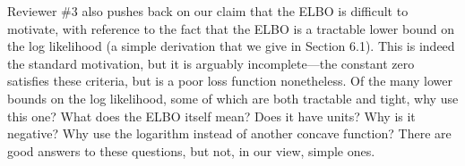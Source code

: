 \documentclass{article}
\theoremstyle{plain}
\theoremstyle{definition}
\begin{document}
Reviewer \#3 also pushes back on our claim that the ELBO is difficult to motivate, with reference to the fact that the ELBO is a tractable lower bound on the log likelihood (a simple derivation that we give in Section 6.1).   This is indeed the standard motivation, but it is arguably incomplete---the constant zero satisfies these criteria, but is a poor loss function nonetheless. Of the many lower bounds on the log likelihood, some of which are both tractable and tight, why use this one? What does the ELBO itself mean? Does it have units? Why is it negative?  Why use the logarithm instead of another concave function?  There are good answers to these questions, but not, in our view, simple ones.
\end{document}

